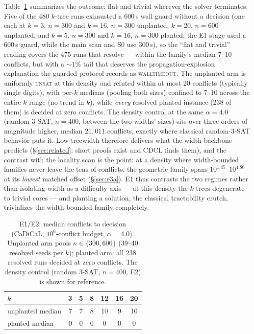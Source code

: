 \documentclass[pdflatex,sn-basic,Numbered]{sn-jnl}
\begin{document}
Table~\ref{tab:e1} summarizes the outcome: flat and trivial wherever the
solver terminates. Five of the 480 $k$-tree runs exhausted a
600\,s wall guard without a decision (one each at $k{=}3$, $n{=}300$ and
$k{=}16$, $n{=}300$ unplanted, $k{=}20$, $n{=}600$ unplanted, and $k{=}5$,
$n{=}300$ and $k{=}16$, $n{=}300$ planted; the E1 stage used a 600\,s
guard, while the main scan and S0 use 300\,s), so the ``flat and trivial''
reading covers the 475 runs that resolve --- within the family's median
7--10 conflicts, but with a ${\sim}1\%$ tail that deserves the
propagation-explosion explanation the guarded protocol records as
\textsc{walltimeout}. The unplanted
arm is uniformly \textsc{unsat} at this density and refuted within at most 20 conflicts (typically single
digits), with per-$k$ medians (pooling both
sizes) confined to $7$--$10$ across the entire $k$ range (no trend in
$k$), while \emph{every} resolved planted instance (238 of them) is
decided at zero conflicts. The density control at the same $\alpha = 4.0$
(random 3-SAT, $n{=}400$, between the two widths' sizes) sits over three
orders of magnitude higher, median $21{,}011$ conflicts, exactly where
classical random-3-SAT behavior puts it. Low treewidth therefore delivers
what the width backbone predicts (\S\ref{sec:related}: short proofs exist
and CDCL finds them), and the contrast with the locality scan is the point:
at a density where width-bounded families never leave the tens of
conflicts, the geometric family spans $10^{1.45}$--$10^{4.86}$ at its
\emph{lowest} matched offset (\S\ref{sec:e3a}). E1 thus contrasts the two
regimes rather than isolating width as a difficulty axis --- at this density
the $k$-trees degenerate to trivial cores --- and planting a
solution, the classical tractability crutch, trivializes the width-bounded
family completely.

\begin{table}[h]
\centering
\caption{E1/E2: median conflicts to decision (CaDiCaL, $10^6$-conflict
budget, $\alpha = 4.0$). Unplanted arm pools $n \in \{300,600\}$ (39--40
resolved seeds per $k$); planted arm: all 238 resolved runs decided at
zero conflicts. The density control (random 3-SAT, $n{=}400$, E2) is shown
for reference.}
\label{tab:e1}
\begin{tabular}{lcccccc}
\toprule
$k$ & 3 & 5 & 8 & 12 & 16 & 20\\
\midrule
unplanted median & 7 & 7 & 8 & 10 & 9 & 10\\
planted median & 0 & 0 & 0 & 0 & 0 & 0\\
\bottomrule
\end{tabular}
\end{table}
\end{document}
